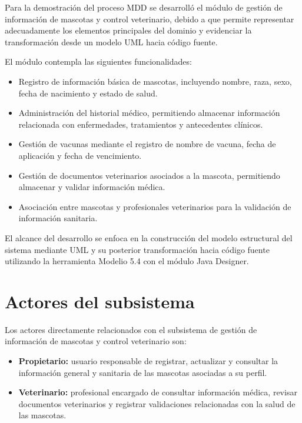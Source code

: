 \documentclass[10pt,a4paper,openany]{report}
\begin{document}
	Para la demostración del proceso MDD se desarrolló el módulo de gestión de
	información de mascotas y control veterinario, debido a que permite representar
	adecuadamente los elementos principales del dominio y evidenciar la transformación
	desde un modelo UML hacia código fuente.
	
	El módulo contempla las siguientes funcionalidades:
	
	\begin{itemize}
		
		\item Registro de información básica de mascotas, incluyendo nombre, raza, sexo,
		fecha de nacimiento y estado de salud.
		
		\item Administración del historial médico, permitiendo almacenar información
		relacionada con enfermedades, tratamientos y antecedentes clínicos.
		
		\item Gestión de vacunas mediante el registro de nombre de vacuna, fecha de
		aplicación y fecha de vencimiento.
		
		\item Gestión de documentos veterinarios asociados a la mascota, permitiendo
		almacenar y validar información médica.
		
		\item Asociación entre mascotas y profesionales veterinarios para la validación de
		información sanitaria.
		
	\end{itemize}
	
	El alcance del desarrollo se enfoca en la construcción del modelo estructural del
	sistema mediante UML y su posterior transformación hacia código fuente utilizando
	la herramienta Modelio 5.4 con el módulo Java Designer.
	
	
	
	\section{Actores del subsistema}
	
	Los actores directamente relacionados con el subsistema de gestión de
	información de mascotas y control veterinario son:
	
	\begin{itemize}
		
		\item \textbf{Propietario:} usuario responsable de registrar,
		actualizar y consultar la información general y sanitaria de las
		mascotas asociadas a su perfil.
		
		\item \textbf{Veterinario:} profesional encargado de consultar
		información médica, revisar documentos veterinarios y registrar
		validaciones relacionadas con la salud de las mascotas.
		
	\end{itemize}
	
\end{document}
